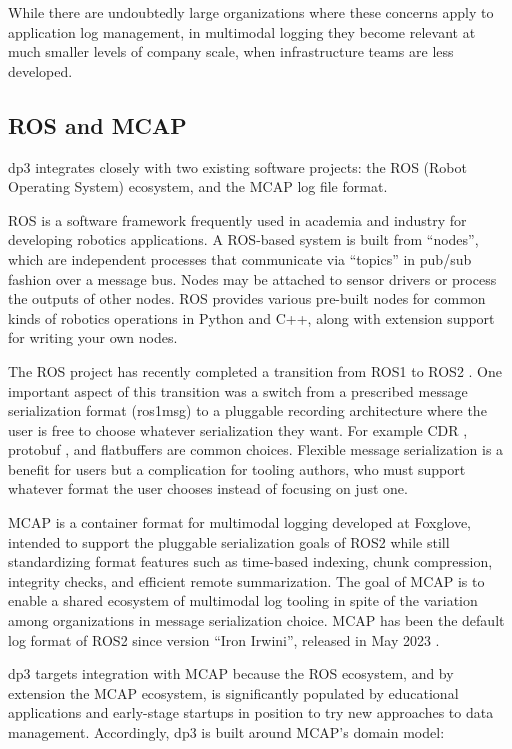 \documentclass[9pt,twocolumn]{article}
\newcommand{\q}[1]{``#1''}
\begin{document}
    While there are undoubtedly large organizations where these concerns apply
    to application log management, in multimodal logging they become relevant
    at much smaller levels of company scale, when infrastructure teams are less
    developed.

    \subsection{ROS and MCAP}
    dp3 integrates closely with two existing software projects: the ROS (Robot
    Operating System) ecosystem, and the MCAP log file format.

    ROS is a software framework frequently used in academia and industry for
    developing robotics applications. A ROS-based system is built from
    \q{nodes}, which are independent processes that communicate via \q{topics}
    in pub/sub fashion over a message bus. Nodes may be attached to sensor
    drivers or process the outputs of other nodes. ROS provides various
    pre-built nodes for common kinds of robotics operations in Python and C++,
    along with extension support for writing your own nodes.

    The ROS project has recently completed a transition from ROS1 to ROS2
    \cite{ROS2}. One important aspect of this transition was a switch from a
    prescribed message serialization format (ros1msg) to a pluggable recording
    architecture where the user is free to choose whatever serialization they want.
    For example CDR \cite{cdr}, protobuf \cite{protobuf}, and flatbuffers
    \cite{flatbuffers} are common choices. Flexible message serialization is a
    benefit for users but a complication for tooling authors, who must support
    whatever format the user chooses instead of focusing on just one.

    MCAP is a container format for multimodal logging developed at Foxglove,
    intended to support the pluggable serialization goals of ROS2 while still
    standardizing format features such as time-based indexing, chunk compression,
    integrity checks, and efficient remote summarization. The goal of MCAP is to
    enable a shared ecosystem of multimodal log tooling in spite of the variation
    among organizations in message serialization choice. MCAP has been the
    default log format of ROS2 since version \q{Iron Irwini}, released in May
    2023 \cite{irwini}.

    dp3 targets integration with MCAP because the ROS ecosystem, and by extension
    the MCAP ecosystem, is significantly populated by educational applications
    and early-stage startups in position to try new approaches to data
    management. Accordingly, dp3 is built around MCAP’s domain model:
\end{document}
